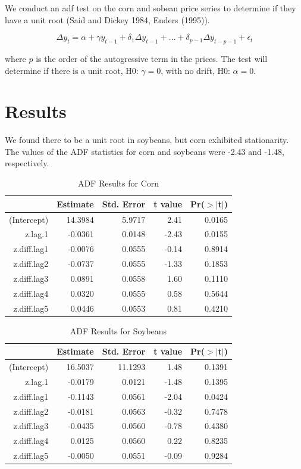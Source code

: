 \documentclass[]{elsarticle} %
\begin{document}
We conduct an adf test on the corn and sobean price series to determine
if they have a unit root (Said and Dickey 1984, Enders (1995)).

\begin{equation}
\Delta y_t = \alpha + \gamma y_{t-1} + \delta_1 \Delta y_{t-1} + \dots + \delta_{p-1} \Delta y_{t-p-1} + \epsilon_t
\end{equation}

where \(p\) is the order of the autogressive term in the prices. The
test will determine if there is a unit root, H0: \(\gamma = 0\), with no
drift, H0: \(\alpha = 0\).

\section{Results}\label{results}

We found there to be a unit root in soybeans, but corn exhibited
stationarity. The values of the ADF statistics for corn and soybeans
were -2.43 and -1.48, respectively.

\clearpage

\begin{table}[ht]
\centering
\caption{ADF Results for Corn} 
\begin{tabular}{rrrrr}
  \hline
 & Estimate & Std. Error & t value & Pr($>$$|$t$|$) \\ 
  \hline
(Intercept) & 14.3984 & 5.9717 & 2.41 & 0.0165 \\ 
  z.lag.1 & -0.0361 & 0.0148 & -2.43 & 0.0155 \\ 
  z.diff.lag1 & -0.0076 & 0.0555 & -0.14 & 0.8914 \\ 
  z.diff.lag2 & -0.0737 & 0.0555 & -1.33 & 0.1853 \\ 
  z.diff.lag3 & 0.0891 & 0.0558 & 1.60 & 0.1110 \\ 
  z.diff.lag4 & 0.0320 & 0.0555 & 0.58 & 0.5644 \\ 
  z.diff.lag5 & 0.0446 & 0.0553 & 0.81 & 0.4210 \\ 
   \hline
\end{tabular}
\end{table}

\begin{table}[ht]
\centering
\caption{ADF Results for Soybeans} 
\begin{tabular}{rrrrr}
  \hline
 & Estimate & Std. Error & t value & Pr($>$$|$t$|$) \\ 
  \hline
(Intercept) & 16.5037 & 11.1293 & 1.48 & 0.1391 \\ 
  z.lag.1 & -0.0179 & 0.0121 & -1.48 & 0.1395 \\ 
  z.diff.lag1 & -0.1143 & 0.0561 & -2.04 & 0.0424 \\ 
  z.diff.lag2 & -0.0181 & 0.0563 & -0.32 & 0.7478 \\ 
  z.diff.lag3 & -0.0435 & 0.0560 & -0.78 & 0.4380 \\ 
  z.diff.lag4 & 0.0125 & 0.0560 & 0.22 & 0.8235 \\ 
  z.diff.lag5 & -0.0050 & 0.0551 & -0.09 & 0.9284 \\ 
   \hline
\end{tabular}
\end{table}
\end{document}
